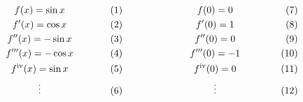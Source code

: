 \documentclass{article}
\begin{document}
$\begin{array}{c c}
\parbox[c]{0.5\textwidth}{
	\begin{gather*}
	f(x) = \sin x\\
	f'(x) = \cos x\\
	f''(x) = -\sin x\\
	f'''(x) = -\cos x\\
	f^{\text{iv}}(x) = \sin x\\
	\vdots
	\end{gather*}}
&
\parbox[c]{0.5\textwidth}{
	\begin{gather*}
	f(0) = 0\\
	f'(0) = 1\\
	f''(0) = 0\\
	f'''(0) = -1\\
	f^{\text{iv}}(0) = 0\\
	\vdots
	\end{gather*}}
\end{array}$
\end{document}
